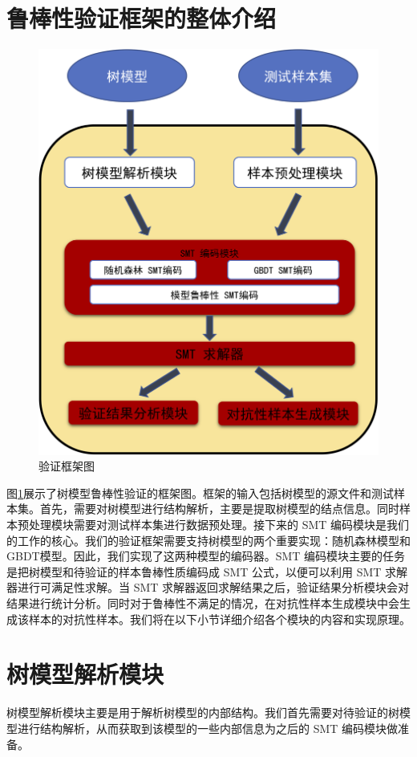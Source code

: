 \section{鲁棒性验证框架的整体介绍}
\begin{figure}[!hbt]
\centering
	\includegraphics[scale=0.7]{fig2/C3/LBXYZKJT.png}%
	\caption{验证框架图}
	\label{fig:鲁棒性验证框架图}	
\end{figure}
图\ref{fig:鲁棒性验证框架图}展示了树模型鲁棒性验证的框架图。框架的输入包括树模型的源文件和测试样本集。首先，需要对树模型进行结构解析，主要是提取树模型的结点信息。同时样本预处理模块需要对测试样本集进行数据预处理。接下来的 SMT 编码模块是我们的工作的核心。我们的验证框架需要支持树模型的两个重要实现：随机森林模型和 GBDT模型。因此，我们实现了这两种模型的编码器。SMT 编码模块主要的任务是把树模型和待验证的样本鲁棒性质编码成 SMT 公式，以便可以利用 SMT 求解器进行可满足性求解。当 SMT 求解器返回求解结果之后，验证结果分析模块会对结果进行统计分析。同时对于鲁棒性不满足的情况，在对抗性样本生成模块中会生成该样本的对抗性样本。我们将在以下小节详细介绍各个模块的内容和实现原理。

\section{树模型解析模块}
树模型解析模块主要是用于解析树模型的内部结构。我们首先需要对待验证的树模型进行结构解析，从而获取到该模型的一些内部信息为之后的 SMT 编码模块做准备。

